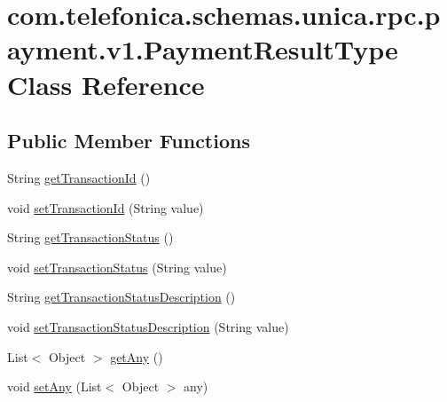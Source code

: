 \hypertarget{classcom_1_1telefonica_1_1schemas_1_1unica_1_1rpc_1_1payment_1_1v1_1_1PaymentResultType}{
\section{com.telefonica.schemas.unica.rpc.payment.v1.PaymentResultType Class Reference}
\label{classcom_1_1telefonica_1_1schemas_1_1unica_1_1rpc_1_1payment_1_1v1_1_1PaymentResultType}
}
\subsection*{Public Member Functions}
\begin{DoxyCompactItemize}
\item 
String \hyperlink{classcom_1_1telefonica_1_1schemas_1_1unica_1_1rpc_1_1payment_1_1v1_1_1PaymentResultType_ac2f1c09f2ff8970e29bf1bd825a6731a}{getTransactionId} ()
\item 
void \hyperlink{classcom_1_1telefonica_1_1schemas_1_1unica_1_1rpc_1_1payment_1_1v1_1_1PaymentResultType_a589a11a0894943371284a07836005f68}{setTransactionId} (String value)
\item 
String \hyperlink{classcom_1_1telefonica_1_1schemas_1_1unica_1_1rpc_1_1payment_1_1v1_1_1PaymentResultType_a94e4a269a3d8be354509b26552043179}{getTransactionStatus} ()
\item 
void \hyperlink{classcom_1_1telefonica_1_1schemas_1_1unica_1_1rpc_1_1payment_1_1v1_1_1PaymentResultType_a3fe47874f0fbb307280e53b7afb21a7e}{setTransactionStatus} (String value)
\item 
String \hyperlink{classcom_1_1telefonica_1_1schemas_1_1unica_1_1rpc_1_1payment_1_1v1_1_1PaymentResultType_a1c865964a22cb1ae2a809137022b9dfd}{getTransactionStatusDescription} ()
\item 
void \hyperlink{classcom_1_1telefonica_1_1schemas_1_1unica_1_1rpc_1_1payment_1_1v1_1_1PaymentResultType_ac56a8e1a299e77e75cc65d1df5a8f144}{setTransactionStatusDescription} (String value)
\item 
List$<$ Object $>$ \hyperlink{classcom_1_1telefonica_1_1schemas_1_1unica_1_1rpc_1_1payment_1_1v1_1_1PaymentResultType_a188cbbf8172a515400402a659f1698ef}{getAny} ()
\item 
void \hyperlink{classcom_1_1telefonica_1_1schemas_1_1unica_1_1rpc_1_1payment_1_1v1_1_1PaymentResultType_ab2d9e791cce66876b9c349fec15d9609}{setAny} (List$<$ Object $>$ any)
\end{DoxyCompactItemize}
